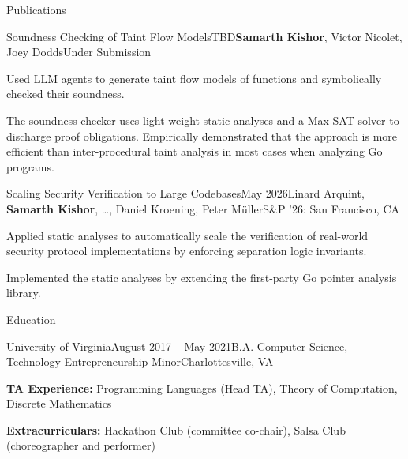 \documentclass{resume}
\begin{document}
\begin{rSection}{Publications}

  \begin{rSubsection}{Soundness Checking of Taint Flow Models}{TBD}{\textbf{Samarth Kishor}, Victor Nicolet, Joey Dodds}{Under Submission}
    \item Used LLM agents to generate taint flow models of functions and symbolically checked their soundness.
    \item The soundness checker uses light-weight static analyses and a Max-SAT solver to discharge proof obligations. Empirically demonstrated that the approach is more efficient than inter-procedural taint analysis in most cases when analyzing Go programs.
  \end{rSubsection}

  \begin{rSubsection}{Scaling Security Verification to Large Codebases}{May 2026}{Linard Arquint, \textbf{Samarth Kishor}, \ldots, Daniel Kroening, Peter M\"uller}{S\&P '26: San Francisco, CA}
    \item Applied static analyses to automatically scale the verification of real-world security protocol implementations by enforcing separation logic invariants.
    \item Implemented the static analyses by extending the first-party Go pointer analysis library.
  \end{rSubsection}

\end{rSection}

\begin{rSection}{Education}

  \begin{rSubsection}{University of Virginia}{August 2017 -- May 2021}{B.A. Computer Science, Technology Entrepreneurship Minor}{Charlottesville, VA}
    \item \textbf{TA Experience:} Programming Languages (Head TA), Theory of Computation, Discrete Mathematics
    \item \textbf{Extracurriculars:} Hackathon Club (committee co-chair), Salsa Club (choreographer and performer)
  \end{rSubsection}

\end{rSection}
\end{document}
